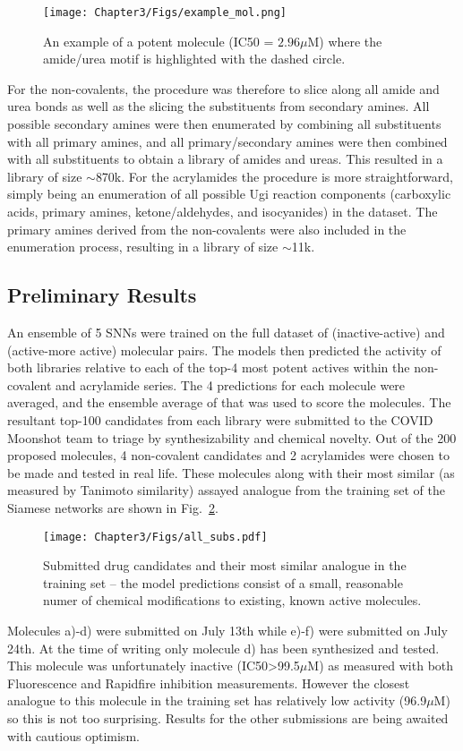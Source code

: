 \begin{figure}[!h] %
\centering
\texttt{[image: Chapter3/Figs/example\_mol.png]}
\caption{\label{fig:example} An example of a potent molecule (IC50 = $2.96\mu$M) where the amide/urea motif is highlighted with the dashed circle.}
\end{figure}

For the non-covalents, the procedure was therefore to slice along all amide and urea bonds as well as the slicing the substituents from secondary amines. All possible secondary amines were then enumerated by combining all substituents with all primary amines, and all primary/secondary amines were then combined with all substituents to obtain a library of amides and ureas. This resulted in a library of size $\sim$870k. For the acrylamides the procedure is more straightforward, simply being an enumeration of all possible Ugi reaction components (carboxylic acids, primary amines, ketone/aldehydes, and isocyanides) in the dataset. The primary amines derived from the non-covalents were also included in the enumeration process, resulting in a library of size $\sim$11k. 

\subsection{Preliminary Results}
An ensemble of 5 SNNs were trained on the full dataset of (inactive-active) and (active-more active) molecular pairs. The models then predicted the activity of both libraries relative to each of the top-4 most potent actives within the non-covalent and acrylamide series. The 4 predictions for each molecule were averaged, and the ensemble average of that was used to score the molecules. The resultant top-100 candidates from each library were submitted to the COVID Moonshot team to triage by synthesizability and chemical novelty. Out of the 200 proposed molecules, 4 non-covalent candidates and 2 acrylamides were chosen to be made and tested in real life. These molecules along with their most similar (as measured by Tanimoto similarity) assayed analogue from the training set of the Siamese networks are shown in Fig.~\ref{fig:moonshot_subs}.

\begin{figure}[!h] %
\centering
\texttt{[image: Chapter3/Figs/all\_subs.pdf]}
\caption{\label{fig:moonshot_subs} Submitted drug candidates and their most similar analogue in the training set -- the model predictions consist of a small, reasonable numer of chemical modifications to existing, known active molecules.}
\end{figure}

Molecules a)-d) were submitted on July 13th while e)-f) were submitted on July 24th. At the time of writing only molecule d) has been synthesized and tested. This molecule was unfortunately inactive (IC50>99.5$\mu$M) as measured with both Fluorescence and Rapidfire inhibition measurements. However the closest analogue to this molecule in the training set has relatively low activity (96.9$\mu$M) so this is not too surprising. Results for the other submissions are being awaited with cautious optimism.